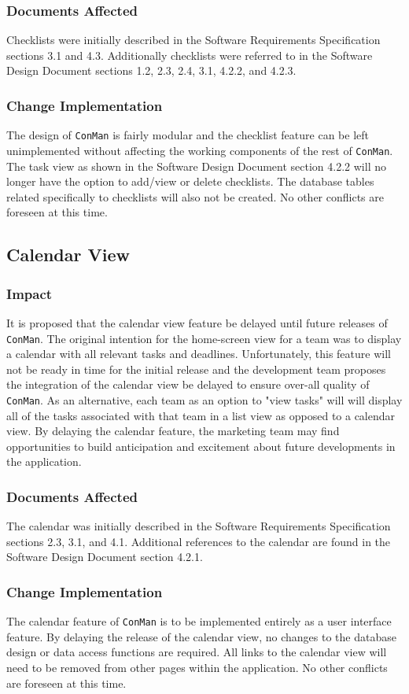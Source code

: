 \documentclass{article}
\begin{document}
\subsubsection{Documents Affected}
Checklists were initially described in the Software Requirements Specification sections 3.1 and 4.3.  Additionally checklists were referred to in the Software Design Document sections 1.2, 2.3, 2.4, 3.1, 4.2.2, and 4.2.3.

\subsubsection{Change Implementation}
The design of \texttt{ConMan} is fairly modular and the checklist feature can be left unimplemented without affecting the working components of the rest of \texttt{ConMan}.
The task view as shown in the Software Design Document section 4.2.2 will no longer have the option to add/view or delete checklists.
The database tables related specifically to checklists will also not be created.
No other conflicts are foreseen at this time.

\newpage
\subsection{Calendar View}
\subsubsection{Impact}
It is proposed that the calendar view feature be delayed until future releases of \texttt{ConMan}.
The original intention for the home-screen view for a team was to display a calendar with all relevant tasks and deadlines.
Unfortunately, this feature will not be ready in time for the initial release and the development team proposes the integration of the calendar view be delayed to ensure over-all quality of \texttt{ConMan}.
As an alternative, each team as an option to "view tasks" will will display all of the tasks associated with that team in a list view as opposed to a calendar view.
By delaying the calendar feature, the marketing team may find opportunities to build anticipation and excitement about future developments in the application.


\subsubsection{Documents Affected}
The calendar was initially described in the Software Requirements Specification sections 2.3, 3.1, and 4.1.
Additional references to the calendar are found in the Software Design Document section 4.2.1.

\subsubsection{Change Implementation}
The calendar feature of \texttt{ConMan} is to be implemented entirely as a user interface feature.
By delaying the release of the calendar view, no changes to the database design or data access functions are required.
All links to the calendar view will need to be removed from other pages within the application.
No other conflicts are foreseen at this time.
\end{document}
